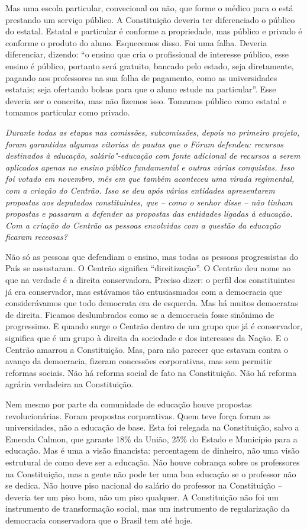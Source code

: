Mas uma escola particular, convecional ou não, que forme o médico para o
 está prestando um serviço público. A Constituição deveria ter
diferenciado o público do estatal. Estatal e particular é conforme a
propriedade, mas público e privado é conforme o produto do aluno.
Esquecemos disso. Foi uma falha. Deveria diferenciar, dizendo: ``o
ensino que cria o profissional de interesse público, esse ensino é
público, portanto será gratuito, bancado pelo estado, seja diretamente,
pagando aos professores na sua folha de pagamento, como as universidades
estatais; seja ofertando bolsas para que o aluno estude na particular''.
Esse deveria ser o conceito, mas não fizemos isso. Tomamos público como
estatal e tomamos particular como privado.

\medskip

\noindent\emph{Durante todas as etapas nas comissões, subcomissões, depois no
primeiro projeto, foram garantidas algumas vitorias de pautas que o
Fórum defendeu: recursos destinados à educação, salário"-educação com
fonte adicional de recursos a serem aplicados apenas no ensino público
fundamental e outras várias conquistas. Isso foi votado em novembro, mês
em que também aconteceu uma virada regimental, com a criação do Centrão.
Isso se deu após várias entidades apresentarem propostas aos deputados
constituintes, que -- como o senhor disse -- não tinham propostas e
passaram a defender as propostas das entidades ligadas à educação. Com a
criação do Centrão as pessoas envolvidas com a questão da educação
ficaram receosas?}

Não só as pessoas que defendiam o ensino, mas todas as
pessoas progressistas do País se assustaram. O Centrão significa
``direitização''. O Centrão deu nome ao que na verdade é a direita
conservadora. Preciso dizer: o perfil dos constituintes já era
conservador, mas estávamos tão entusiasmados com a democracia que
considerávamos que todo democrata era de esquerda. Mas há muitos
democratas de direita. Ficamos deslumbrados como se a democracia fosse
sinônimo de progressimo. E quando surge o Centrão dentro de um grupo que
já é conservador, significa que é um grupo à direita da sociedade e dos
interesses da Nação. E o Centrão amarrou a Constituição. Mas, para não
parecer que estavam contra o avanço da democracia, fizeram concessões
corporativas, mas sem permitir reformas sociais. Não há reforma social
de fato na Constituição. Não há reforma agrária verdadeira na
Constituição.

Nem mesmo por parte da comunidade de educação houve propostas
revolucionárias. Foram propostas corporativas. Quem teve força foram as
universidades, não a educação de base. Esta foi relegada na
Constituição, salvo a Emenda Calmon, que garante 18\% da União, 25\% do
Estado e Município para a educação. Mas é uma a visão financista:
percentagem de dinheiro, não uma visão estrutural de como deve ser a
educação. Não houve cobrança sobre os professores na Constituição, mas a
gente não pode ter uma boa educação se o professor não se dedica. Não
houve piso nacional do salário do professor na Constituição -- deveria
ter um piso bom, não um piso qualquer. A Constituição não foi um
instrumento de transformação social, mas um instrumento de regularização
da democracia conservadora que o Brasil tem até hoje.

